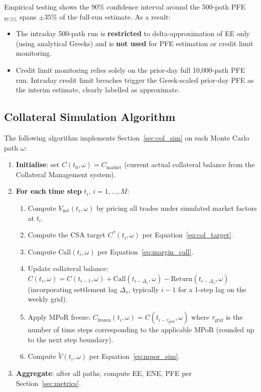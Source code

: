 \documentclass[11pt,a4paper]{article}
\begin{document}
Empirical testing shows the 90\% confidence interval around the 500-path
PFE$_{97.5\%}$ spans $\pm 35\%$ of the full-run estimate. As a result:

\begin{itemize}[noitemsep]
  \item The intraday 500-path run is \textbf{restricted} to delta-approximation
        of EE only (using analytical Greeks) and is \textbf{not used} for
        PFE estimation or credit limit monitoring.
  \item Credit limit monitoring relies solely on the prior-day full 10,000-path
        PFE run. Intraday credit limit breaches trigger the Greek-scaled prior-day
        PFE as the interim estimate, clearly labelled as approximate.
\end{itemize}

\subsection{Collateral Simulation Algorithm}
\label{sec:col_algo}

The following algorithm implements Section~\ref{sec:col_sim} on each Monte
Carlo path $\omega$:

\begin{enumerate}
  \item \textbf{Initialise}: set $C(t_0, \omega) = C_{\text{market}}$ (current
        actual collateral balance from the Collateral Management system).
  \item \textbf{For each time step} $t_i$, $i = 1, \ldots, M$:
    \begin{enumerate}
      \item Compute $V_{\text{net}}(t_i, \omega)$ by pricing all trades under
            simulated market factors at $t_i$.
      \item Compute the CSA target $C^*(t_i, \omega)$ per
            Equation~\eqref{eq:col_target}.
      \item Compute $\text{Call}(t_i, \omega)$ per Equation~\eqref{eq:margin_call}.
      \item Update collateral balance: $C(t_i, \omega) = C(t_{i-1}, \omega)
            + \text{Call}(t_{i-\Delta_s}, \omega) - \text{Return}(t_{i-\Delta_s}, \omega)$
            (incorporating settlement lag $\Delta_s$, typically $i - 1$ for a
            1-step lag on the weekly grid).
      \item Apply MPoR freeze: $C_{\text{frozen}}(t_i, \omega) = C(t_{i - \tau_{\text{grid}}}, \omega)$
            where $\tau_{\text{grid}}$ is the number of time steps corresponding
            to the applicable MPoR (rounded up to the next step boundary).
      \item Compute $\tilde{V}(t_i, \omega)$ per Equation~\eqref{eq:mpor_sim}.
    \end{enumerate}
  \item \textbf{Aggregate}: after all paths, compute EE, ENE, PFE per
        Section~\ref{sec:metrics}.
\end{enumerate}
\end{document}
